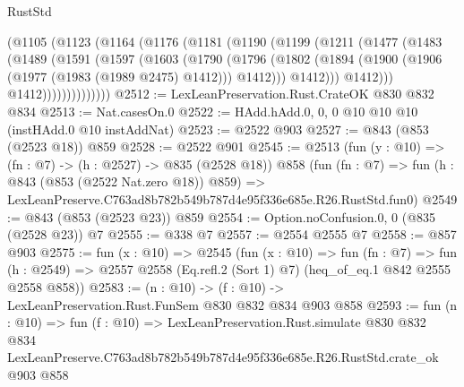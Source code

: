 \begin{lexlean}{RustStd}
\begin{coremodule}
            (@1105
              (@1123
                (@1164
                  (@1176
                    (@1181
                      (@1190
                        (@1199
                          (@1211
                            (@1477
                              (@1483
                                (@1489
                                  (@1591
                                    (@1597
                                      (@1603
                                        (@1790
                                          (@1796
                                            (@1802
                                              (@1894
                                                (@1900
                                                  (@1906 (@1977 (@1983 (@1989 @2475) @1412)))
                                                  @1412)))
                                            @1412)))
                                      @1412)))
                                @1412))))))))))))))
@2512 := LexLeanPreservation.Rust.CrateOK @830 @832 @834
@2513 := Nat.casesOn.{0}
@2522 := HAdd.hAdd.{0, 0, 0} @10 @10 @10 (instHAdd.{0} @10 instAddNat)
@2523 := @2522 @903
@2527 := @843 (@853 (@2523 @18)) @859
@2528 := @2522 @901
@2545 := @2513
    (fun (y : @10) => (fn : @7) -> (h : @2527) -> @835 (@2528 @18))
    @858
    (fun (fn : @7) =>
    fun (h : @843 (@853 (@2522 Nat.zero @18)) @859) =>
    LexLeanPreserve.C763ad8b782b549b787d4e95f336e685e.R26.RustStd.fun0)
@2549 := @843 (@853 (@2523 @23)) @859
@2554 := Option.noConfusion.{0, 0} (@835 (@2528 @23)) @7
@2555 := @338 @7
@2557 := @2554 @2555 @7
@2558 := @857 @903
@2575 := fun (x : @10) =>
  @2545
    (fun (x : @10) =>
    fun (fn : @7) =>
    fun (h : @2549) => @2557 @2558 (Eq.refl.{2} (Sort 1) @7) (heq_of_eq.{1} @842 @2555 @2558 @858))
@2583 := (n : @10) -> (f : @10) -> LexLeanPreservation.Rust.FunSem @830 @832 @834 @903 @858
@2593 := fun (n : @10) =>
  fun (f : @10) =>
  LexLeanPreservation.Rust.simulate
    @830
    @832
    @834
    LexLeanPreserve.C763ad8b782b549b787d4e95f336e685e.R26.RustStd.crate_ok
    @903
    @858
\end{coremodule}
\end{lexlean}
